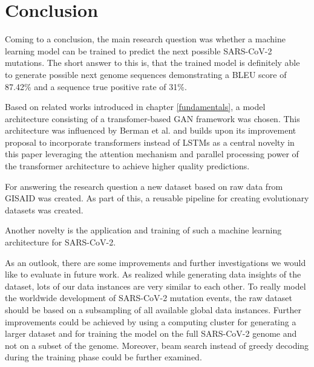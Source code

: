 \section{Conclusion} \label{conclusion}

Coming to a conclusion, the main research question was whether a machine learning model can be trained to predict the next possible \ac{SARS-CoV-2} mutations. The short answer to this is, that the trained model is definitely able to generate possible next genome sequences demonstrating a \ac{BLEU} score of 87.42\% and a sequence true positive rate of 31\%.

Based on related works introduced in chapter \ref{fundamentals}, a model ar\-chi\-tec\-tu\-re consisting of a transfomer-based \ac{GAN} framework was chosen. This ar\-chi\-tec\-tu\-re was influenced by Berman et al. \cite{Berman2020} and builds upon its improvement proposal to incorporate transformers instead of \acp{LSTM} as a central novelty in this paper leveraging the attention mechanism and parallel processing power of the transformer architecture to achieve higher quality predictions. 

For answering the research question a new dataset based on raw data from \ac{GISAID} was created. As part of this, a reusable pipeline for creating evolutionary datasets was created.

Another novelty is the application and training of such a machine learning architecture for \ac{SARS-CoV-2}.


\vspace{0.5cm}

As an outlook, there are some improvements and further investigations we would like to evaluate in future work. As realized while generating data insights of the dataset, lots of our data instances are very similar to each other. To really model the worldwide development of \ac{SARS-CoV-2} mutation events, the raw dataset should be based on a subsampling of all available global data instances. Further improvements could be achieved by using a computing cluster for generating a larger dataset and for training the model on the full \ac{SARS-CoV-2} genome and not on a subset of the genome. Moreover, beam search instead of greedy decoding during the training phase could be further examined.

